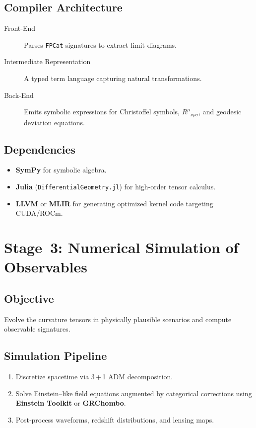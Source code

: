 \documentclass[11pt]{article}
\begin{document}
\subsection{Compiler Architecture}
\begin{description}
  \item[Front‑End] Parses \texttt{FPCat} signatures to extract limit diagrams.
  \item[Intermediate Representation] A typed term language capturing natural transformations.
  \item[Back‑End] Emits symbolic expressions for Christoffel symbols, \(R^{\mu}{}_{\nu\rho\sigma}\), and geodesic deviation equations.
\end{description}

\subsection{Dependencies}
\begin{itemize}
  \item \textbf{SymPy} for symbolic algebra.
  \item \textbf{Julia} (\texttt{DifferentialGeometry.jl}) for high‑order tensor calculus.
  \item \textbf{LLVM} or \textbf{MLIR} for generating optimized kernel code targeting CUDA/ROCm.
\end{itemize}

\section{Stage 3: Numerical Simulation of Observables}
\subsection{Objective}
Evolve the curvature tensors in physically plausible scenarios and compute observable signatures.

\subsection{Simulation Pipeline}
\begin{enumerate}
  \item Discretize spacetime via 3\,+\,1 ADM decomposition.
  \item Solve Einstein–like field equations augmented by categorical corrections using \textbf{Einstein Toolkit} or \textbf{GRChombo}.
  \item Post‑process waveforms, redshift distributions, and lensing maps.
\end{enumerate}
\end{document}
